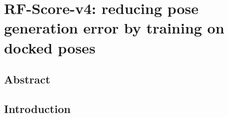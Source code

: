 \chapter{RF-Score-v4: reducing pose generation error by training on docked poses}

\section{Abstract}

\section{Introduction}

\chapterend
